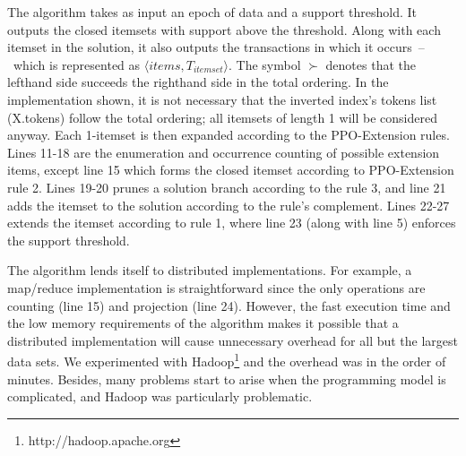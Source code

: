 \documentclass[letterpaper,12pt,titlepage,oneside,final]{book}
\begin{document}
The algorithm takes as input an epoch of data and a support threshold.
It outputs the closed itemsets with support above the threshold.
Along with each itemset in the solution, it also outputs the transactions
in which it occurs~--~which is represented as $\langle items,
T_{itemset} \rangle$.
The symbol $\succ$ denotes that the lefthand side  succeeds the righthand
side in the total ordering.
In the implementation shown, it is not necessary that the inverted index's tokens  list (X.tokens)
follow the total ordering; all itemsets of length 1 will be considered anyway. 
Each 1-itemset is then expanded according to the PPO-Extension rules.
Lines 11-18 are the enumeration and occurrence counting of possible extension items, 
except line 15 which forms the closed itemset according to PPO-Extension rule 2.
Lines 19-20 prunes a solution branch according to the rule 3, 
and line 21 adds the itemset to the solution according to the rule's complement.
Lines 22-27 extends the itemset according to rule 1, 
where line 23 (along with line 5) enforces the support threshold.


The algorithm lends itself to distributed implementations.
For example, a map/reduce implementation is straightforward since the only
operations are counting (line 15) and projection (line 24).
However, the fast execution time and the low memory requirements of the
algorithm makes it possible that a distributed implementation will
cause unnecessary overhead for all but the largest data sets.
We experimented with Hadoop\footnote{http://hadoop.apache.org}
and the overhead was in the order of minutes.
Besides, many problems start to arise 
when the programming model is complicated,
and Hadoop was particularly problematic.
\end{document}
